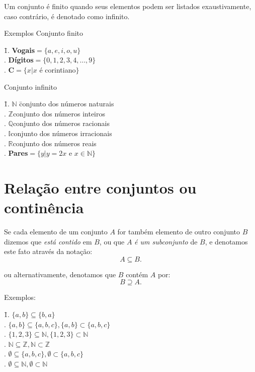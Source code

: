 \documentclass[twoside,a4wide,12pt]{book}
\begin{document}
Um conjunto é finito quando seus elementos podem ser listados
exaustivamente, caso contrário, é denotado como infinito.

\noindent Exemplos
\noindent Conjunto finito
\begin{tabbing}
\hspace{1cm}\=1. {\bf Vogais}$=\{a,e,i,o,u\}$\\
. {\bf Dígitos}$=\{0,1,2,3,4,\ldots,9\}$\\
. {\bf C}$=\{x|x$ é corintiano$\}$\\
\end{tabbing}

\noindent Conjunto infinito
\begin{tabbing}
\hspace{1cm}\=1. $\mathbb{N}$ \hspace{6cm}\= conjunto dos números naturais\\
. $\mathbb{Z}$\>conjunto dos números inteiros\\
. $\mathbb{Q}$\>conjunto dos números racionais\\
. $\mathbb{I}$\>conjunto dos números irracionais\\
. $\mathbb{R}$\>conjunto dos números reais\\
. {\bf Pares}$=\{y|y=2x$ e $x \in \mathbb{N}\}$\\
\end{tabbing}

\section{Relação entre conjuntos ou continência}

Se cada elemento de um conjunto $A$ for também elemento de outro
conjunto $B$ dizemos que {\it está contido} em $B$, ou que $A$
{\it é um subconjunto} de $B$, e denotamos este fato através da
notação:
$$A \subseteq B.$$

\noindent ou alternativamente, denotamos que $B$ contém $A$ por:
$$B\supseteq A.$$

\noindent Exemplos:

\begin{tabbing}
\hspace{1cm}\=1. $\{a,b\}\subseteq\{b,a\}$\\
. $\{a,b\}\subseteq\{a,b,c\},\{a,b\}\subset \{a,b,c\}$\\
. $\{1,2,3\}\subseteq\mathbb{N},\{1,2,3\}\subset\mathbb{N}$\\
. $\mathbb{N}\subseteq\mathbb{Z}, \mathbb{N}\subset\mathbb{Z}$\\
. $\emptyset\subseteq\{a,b,c\},\emptyset\subset\{a,b,c\}$\\
. $\emptyset\subseteq\mathbb{N},\emptyset\subset\mathbb{N}$
\end{tabbing}
\end{document}
